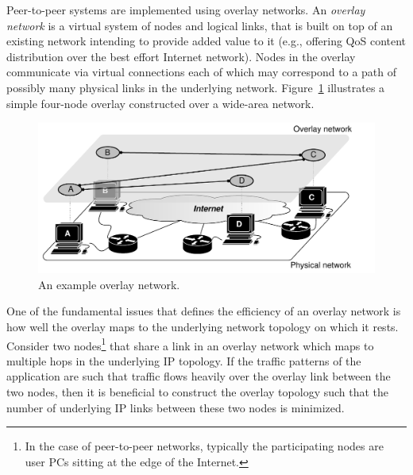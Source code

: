 Peer-to-peer systems are implemented using overlay networks. An \emph{overlay
network} is a virtual system of nodes and logical links, that is built on top of
an existing network intending to provide added value to it (e.g., offering QoS
content distribution over the best effort Internet network). Nodes in the
overlay communicate via virtual connections each of which may correspond to a
path of possibly many physical links in the underlying network.
Figure~\ref{figure:overlay} illustrates a simple four-node overlay constructed
over a wide-area network.

\begin{figure}
\centering
  \includegraphics[scale=0.7]{img/pdf/under-over-lay.pdf}
\caption{An example overlay network.}
\label{figure:overlay}
\end{figure}

One of the fundamental issues that defines the efficiency of an overlay network
is how well the overlay maps to the underlying network topology on which it
rests. Consider two nodes\footnote{In the case of peer-to-peer networks,
typically the participating nodes are user PCs sitting at the edge of the
Internet.} that share a link in an overlay network which maps to multiple hops
in the underlying IP topology. If the traffic patterns of the application
are such that traffic flows heavily over the overlay link between the two nodes,
then it is beneficial to construct the overlay topology such that the number of
underlying IP links between these two nodes is minimized.

